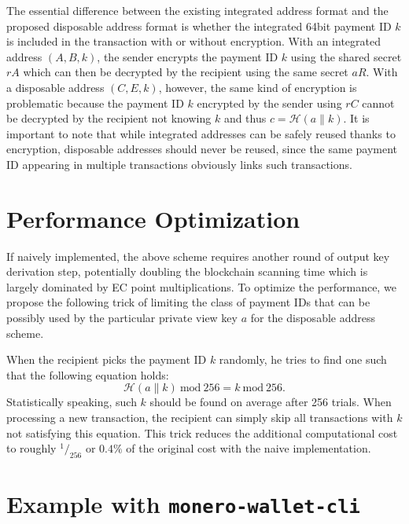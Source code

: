 \documentclass[12pt,english]{mrl}
\theoremstyle{definition}
\numberwithin{equation}{section}
\numberwithin{figure}{section}
\numberwithin{equation}{section}
\numberwithin{equation}{section}
\numberwithin{figure}{section}
\begin{document}
The essential difference between the existing integrated address format and the proposed disposable address format is whether the integrated 64bit payment ID $k$ is included in the transaction with or without encryption. 
With an integrated address $(A,B,k)$, the sender encrypts the payment ID $k$ using the shared secret $rA$ which can then be decrypted by the recipient using the same secret $aR$. 
With a disposable address $(C,E,k)$, however, the same kind of encryption is problematic because the payment ID $k$ encrypted by the sender using $rC$ cannot be decrypted by the recipient not knowing $k$ and thus $c=\mathcal{H}(a \| k)$.
It is important to note that while integrated addresses can be safely reused thanks to encryption, disposable addresses should never be reused, since the same payment ID appearing in multiple transactions obviously links such transactions.


\section{Performance Optimization}\label{performanceOptimization}

If naively implemented, the above scheme requires another round of output key derivation step, potentially doubling the blockchain scanning time which is largely dominated by EC point multiplications. To optimize the performance, we propose the following trick of limiting the class of payment IDs that can be possibly used by the particular private view key $a$ for the disposable address scheme.

When the recipient picks the payment ID $k$ randomly, he tries to find one such that the following equation holds:
\[
\mathcal{H}(a \| k) \ \mathrm{mod} \ 256 = k \ \mathrm{mod} \ 256.
\]
Statistically speaking, such $k$ should be found on average after 256 trials. When processing a new transaction, the recipient can simply skip all transactions with $k$ not satisfying this equation. This trick reduces the additional computational cost to roughly $^1/_{256}$ or $0.4\%$ of the original cost with the naive implementation.


\section{Example with \texttt{monero-wallet-cli}}\label{walletCLI}
\end{document}
